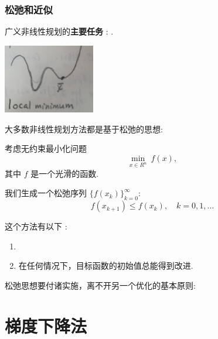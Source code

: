 \documentclass[handout]{beamer}
\begin{document}
\begin{frame}[allowframebreaks]

\frametitle{松弛和近似}

广义非线性规划的\textbf{主要任务} : .

  \begin{flushright}
  \includegraphics[width=0.3\textwidth]{figure/fig_1_sec1_2_1.png}
  \end{flushright}


大多数非线性规划方法都是基于松弛的思想:


\framebreak


考虑无约束最小化问题
\begin{equation}\label{EQ_min_f_unconstrain}
\min_{x\in R^n}^{}\ f(x),
\end{equation}
其中 $f$ 是一个光滑的函数.

我们生成一个松弛序列 $\{f(x_k) \}_{k=0}^{\infty}$:
\begin{equation*}
f(x_{k+1}) \leq f(x_k), \quad k=0,1,\ldots
\end{equation*}

这个方法有以下 :

\begin{enumerate}
\item {}
\item 在任何情况下，目标函数的初始值总能得到改进.
\end{enumerate}

\framebreak

松弛思想要付诸实施，离不开另一个优化的基本原则:


\end{frame}


\section{梯度下降法}
\end{document}
